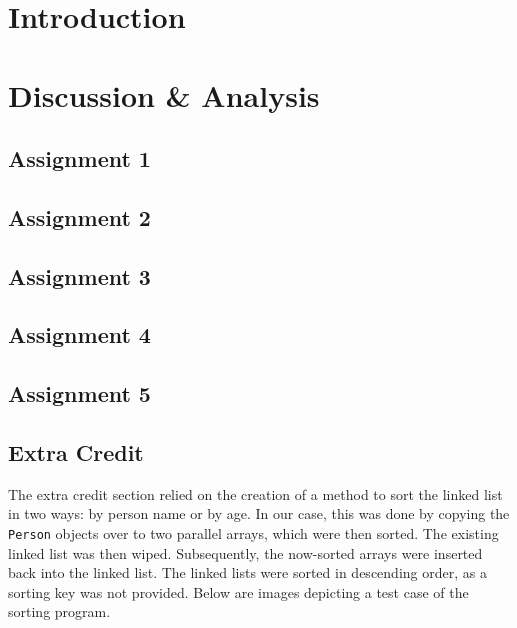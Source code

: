 \documentclass[
	letterpaper, %
	10pt, %
]{CSUniSchoolLabReport}
\begin{document}
\section{Introduction}

\section{Discussion \& Analysis} 

\subsection{Assignment 1}

\subsection{Assignment 2}

\subsection{Assignment 3}

\subsection{Assignment 4}

\subsection{Assignment 5}

\subsection{Extra Credit}

The extra credit section relied on the creation of a method to sort the linked list in two ways: by person name or by age. In our case, this was done by copying the \texttt{Person} objects over to two parallel arrays, which were then sorted. The existing linked list was then wiped. Subsequently, the now-sorted arrays were inserted back into the linked list. The linked lists were sorted in descending order, as a sorting key was not provided. Below are images depicting a test case of the sorting program.
\end{document}
